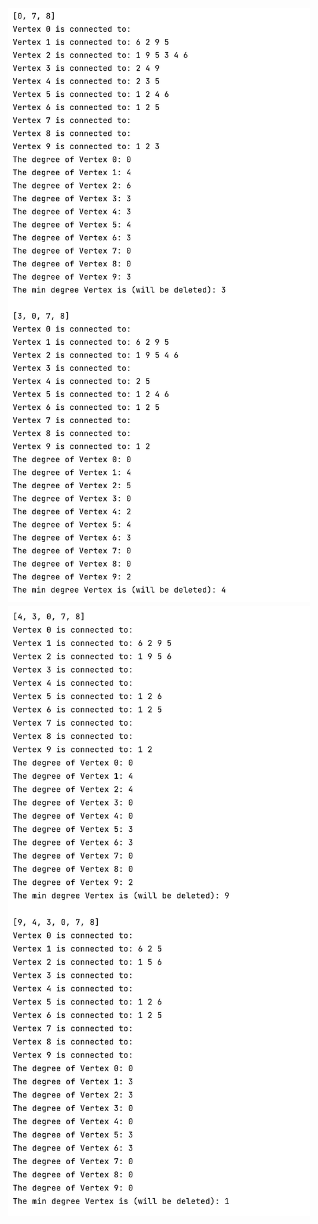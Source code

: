 \documentclass{article}
\begin{document}
\begin{enumerate}
\begin{center}
        \includegraphics[width=0.6\textwidth]{p29.png}
        \includegraphics[width=0.6\textwidth]{p30.png}

\end{center}
\end{enumerate}
\end{document}
